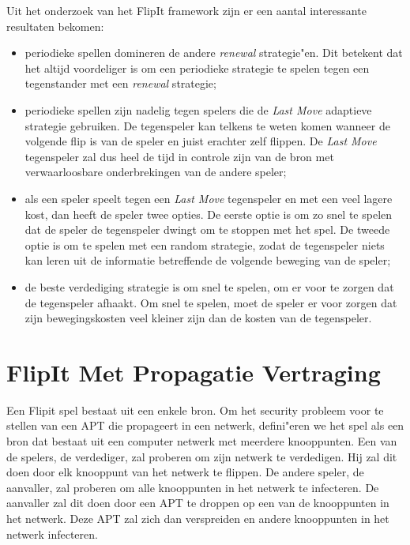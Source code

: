 \documentclass[master=cws, masteroption=vs,english]{kulemt}
\begin{document}
\begin{abstract*}
Uit het onderzoek van het FlipIt framework zijn er een aantal interessante resultaten bekomen:
\begin{itemize}
\item periodieke spellen domineren de andere \textit{renewal }strategie"en. Dit betekent dat het altijd voordeliger is om een periodieke strategie te spelen tegen een tegenstander met een \textit{renewal} strategie;
\item periodieke spellen zijn nadelig tegen spelers die de\textit{ Last Move} adaptieve strategie gebruiken. De tegenspeler kan telkens te weten komen wanneer de volgende flip is van de speler en juist erachter zelf flippen. De \textit{Last Move} tegenspeler zal dus heel de tijd in controle zijn van de bron met verwaarloosbare onderbrekingen van de andere speler;
\item als een speler speelt tegen een \textit{Last Move} tegenspeler en met een veel lagere kost, dan heeft de speler twee opties. De eerste optie is om zo snel te spelen dat de speler de tegenspeler dwingt om te stoppen met het spel. De tweede optie is om te spelen met een random strategie, zodat de tegenspeler niets kan leren uit de informatie betreffende de volgende beweging van de speler;
\item de beste verdediging strategie is om snel te spelen, om er voor te zorgen dat de tegenspeler afhaakt. Om snel te spelen, moet de speler er voor zorgen dat zijn bewegingskosten veel kleiner zijn dan de kosten van de tegenspeler.
\end{itemize}


\section {FlipIt Met Propagatie Vertraging}
\label{ch: flipitvirus}
Een Flipit spel bestaat uit een enkele bron. Om het security probleem voor te stellen van een APT die propageert in een netwerk, defini"eren we het spel als een bron dat bestaat uit een computer netwerk met meerdere knooppunten. Een van de spelers, de verdediger, zal proberen om zijn netwerk te verdedigen. Hij zal dit doen door elk knooppunt van het netwerk te flippen. De andere speler, de aanvaller, zal proberen om alle knooppunten in het netwerk te infecteren. De aanvaller zal dit doen door een APT te droppen op een van de knooppunten in het netwerk. Deze APT zal zich dan verspreiden en andere knooppunten in het netwerk infecteren. \\


\end{abstract*}
\end{document}
